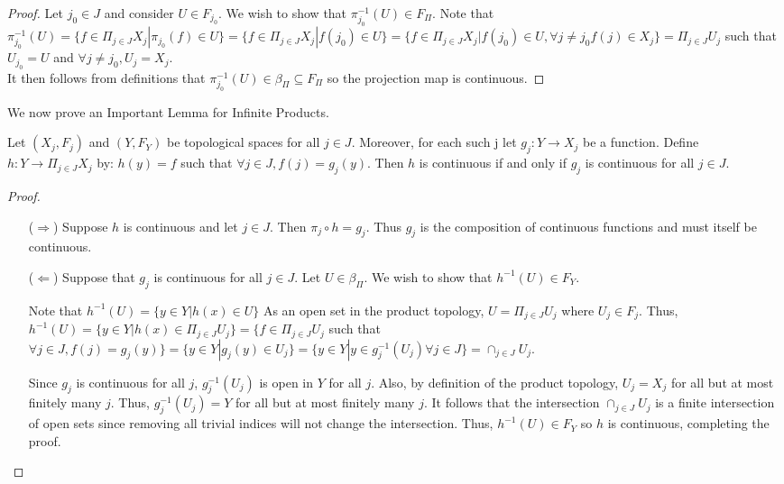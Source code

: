 \begin{proof}
Let $j_{0} \in J$ and consider $U \in F_{j_{0}}$. We wish to show that $\pi_{j_{0}}^{-1}(U) \in  F_{\Pi}$.  Note that $\pi_{j_{0}}^{-1}(U) = \{f \in \Pi_{j \in J}X_j | \pi_{j_{0}}(f) \in U\} = \{f \in \Pi_{j \in J}X_j | f(j_{0}) \in U\} = \{f \in \Pi_{j \in J}X_j | f(j_{0}) \in U, \forall j \neq j_{0} f(j) \in X_{j}\}= \Pi_{j \in J} U_j$ such that $U_{j_{0}} = U$ and $\forall j \neq j_{0}, U_j = X_j$.\\
It then follows from definitions that $\pi_{j_{0}}^{-1}(U) \in \beta_{\Pi} \subseteq F_{\Pi}$ so the projection map is continuous.
\end{proof}

We now prove an Important Lemma for Infinite Products.
\begin{lemma}
Let $(X_j,F_j)$ and $(Y,F_Y)$ be topological spaces for all $j \in J$.  Moreover, for each such j let $g_j : Y \rightarrow X_j$ be a function.  Define $h: Y \rightarrow \Pi_{j \in J}X_j$ by: $h(y) = f$ such that $\forall j \in J, f(j) = g_{j}(y)$.  Then $h$ is continuous if and only if $g_j$ is continuous for all $j \in J$.
\end{lemma}

\begin{proof}
\begin{itemize}
\item[($\Rightarrow$)]
Suppose $h$ is continuous and let $j \in J$.  Then $\pi_j \circ h = g_j$.  Thus $g_j$ is the composition of continuous functions and must itself be continuous.
\item [($\Leftarrow$)]
Suppose that $g_j$ is continuous for all $j \in J$.  Let $U \in \beta_{\Pi}.$  We wish to show that $h^{-1}(U) \in F_{Y}$.

Note that $h^{-1}(U) = \{y \in Y | h(x) \in U\}$  As an open set in the product topology, $U = \Pi_{j \in J}U_j$ where $U_j \in F_j$.  Thus, $h^{-1}(U) = \{y \in Y | h(x) \in \Pi_{j \in J}U_j\} = \{f \in \Pi_{j \in J}U_j$ such that $\forall j \in J, f(j) = g_{j}(y)\} = \{y \in Y | g_{j}(y) \in U_j\} = \{y \in Y | y \in g_{j}^{-1}(U_j) \forall j \in J\} = \cap_{j \in J} U_j$.

Since $g_j$ is continuous for all $j$, $g_{j}^{-1}(U_j)$ is open in $Y$ for all $j$.  Also, by definition of the product topology, $U_j = X_j$ for all but at most finitely many $j$.  Thus, $g_{j}^{-1}(U_j) = Y$ for all but at most finitely many $j$.  It follows that the intersection $\cap_{j \in J} U_j$ is a finite intersection of open sets since removing all trivial indices will not change the intersection.  Thus, $h^{-1}(U) \in F_Y$ so $h$ is continuous, completing the proof.
\end{itemize}
\end{proof}


